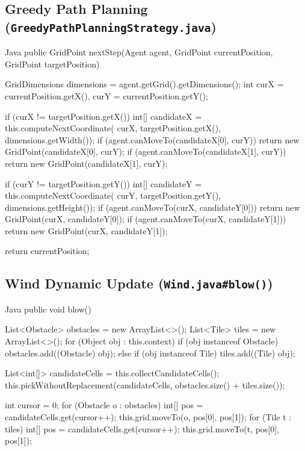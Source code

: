\subsection{Greedy Path Planning (\texttt{GreedyPathPlanningStrategy.java})}

\begin{sustechcode}{Java}
public GridPoint nextStep(Agent agent, GridPoint currentPosition,
        GridPoint targetPosition) {
    GridDimensions dimensions = agent.getGrid().getDimensions();
    int curX = currentPosition.getX(), curY = currentPosition.getY();

    if (curX != targetPosition.getX()) {
        int[] candidateX = this.computeNextCoordinate(
                curX, targetPosition.getX(), dimensions.getWidth());
        if (agent.canMoveTo(candidateX[0], curY))
            return new GridPoint(candidateX[0], curY);
        if (agent.canMoveTo(candidateX[1], curY))
            return new GridPoint(candidateX[1], curY);
    }

    if (curY != targetPosition.getY()) {
        int[] candidateY = this.computeNextCoordinate(
                curY, targetPosition.getY(), dimensions.getHeight());
        if (agent.canMoveTo(curX, candidateY[0]))
            return new GridPoint(curX, candidateY[0]);
        if (agent.canMoveTo(curX, candidateY[1]))
            return new GridPoint(curX, candidateY[1]);
    }

    return currentPosition;
}
\end{sustechcode}

\subsection{Wind Dynamic Update (\texttt{Wind.java\#blow()})}

\begin{sustechcode}{Java}
public void blow() {
    List<Obstacle> obstacles = new ArrayList<>();
    List<Tile> tiles = new ArrayList<>();
    for (Object obj : this.context) {
        if (obj instanceof Obstacle) obstacles.add((Obstacle) obj);
        else if (obj instanceof Tile) tiles.add((Tile) obj);
    }

    List<int[]> candidateCells = this.collectCandidateCells();
    this.pickWithoutReplacement(candidateCells, obstacles.size() + tiles.size());

    int cursor = 0;
    for (Obstacle o : obstacles) {
        int[] pos = candidateCells.get(cursor++);
        this.grid.moveTo(o, pos[0], pos[1]);
    }
    for (Tile t : tiles) {
        int[] pos = candidateCells.get(cursor++);
        this.grid.moveTo(t, pos[0], pos[1]);
    }
}
\end{sustechcode}

